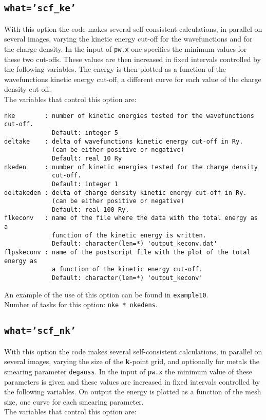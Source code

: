 \documentclass[12pt,a4paper]{article}
\begin{document}
\subsection{\color{web-blue}\texttt{what='scf\_ke'}}
With this option the code makes several self-consistent calculations, 
in parallel on several images, varying the kinetic energy cut-off for 
the wavefunctions and for the charge density. 
In the input of \texttt{pw.x} one specifies the minimum values for these two 
cut-offs. These values are then increased in fixed intervals controlled by the 
following variables. The energy is then plotted as a function of the 
wavefunctions kinetic energy cut-off, a different curve for each value of 
the charge density cut-off. \\
The variables that control this option are:

\begin{verbatim}
nke        : number of kinetic energies tested for the wavefunctions cut-off.
             Default: integer 5
deltake    : delta of wavefunctions kinetic energy cut-off in Ry.
             (can be either positive or negative)
             Default: real 10 Ry
nkeden     : number of kinetic energies tested for the charge density
             cut-off.
             Default: integer 1
deltakeden : delta of charge density kinetic energy cut-off in Ry.
             (can be either positive or negative)
             Default: real 100 Ry.
flkeconv   : name of the file where the data with the total energy as a
             function of the kinetic energy is written.
             Default: character(len=*) 'output_keconv.dat'
flpskeconv : name of the postscript file with the plot of the total energy as
             a function of the kinetic energy cut-off.
             Default: character(len=*) 'output_keconv'
\end{verbatim}
An example of the use of this option can be found in \texttt{example10}. \\
Number of tasks for this option: \texttt{nke * nkedens}.

\subsection{\color{web-blue}\texttt{what='scf\_nk'}}
With this option the code makes several self-consistent calculations, 
in parallel on several images, varying the size of the {\bf k}-point grid, 
and optionally for metals the smearing parameter \texttt{degauss}. In the 
input of \texttt{pw.x} the minimum value of these parameters is given and 
these values are increased in fixed intervals controlled by the following 
variables. On output the energy is plotted as a function of the mesh size, 
one curve for each smearing parameter.\\
The variables that control this option are:
\end{document}
